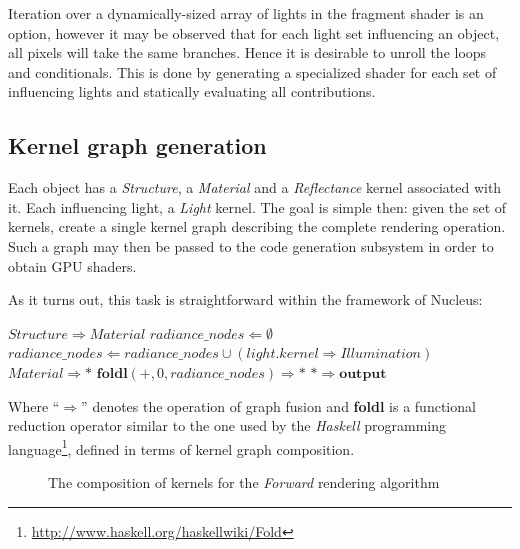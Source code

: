 Iteration over a dynamically-sized array of lights in the fragment shader is an option, however it may be observed that for each light set influencing an object, all pixels will take the same branches. Hence it is desirable to unroll the loops and conditionals. This is done by generating a specialized shader for each set of influencing lights and statically evaluating all contributions.

\subsection{Kernel graph generation}

Each object has a \emph{Structure}, a \emph{Material} and a \emph{Reflectance} kernel associated with it. Each influencing light, a \emph{Light} kernel. The goal is simple then: given the set of kernels, create a single kernel graph describing the complete rendering operation. Such a graph may then be passed to the code generation subsystem in order to obtain GPU shaders.

As it turns out, this task is straightforward within the framework of Nucleus:
	
\begin{algorithmic}
\STATE $Structure \Rightarrow Material$
\STATE $radiance\_nodes \Leftarrow \emptyset$
	\STATE $radiance\_nodes \Leftarrow radiance\_nodes \cup (light.kernel \Rightarrow Illumination)$
\ENDFOR
\STATE $Material \Rightarrow *$
\STATE $\textbf{foldl}(+, 0,radiance\_nodes) \Rightarrow *$
\STATE $* \Rightarrow \textbf{output}$
\end{algorithmic}

Where ``$\Rightarrow$'' denotes the operation of graph fusion and \textbf{foldl} is a functional reduction operator similar to the one used by the \emph{Haskell} programming language\footnote{\url{http://www.haskell.org/haskellwiki/Fold}}, defined in terms of kernel graph composition.

\begin{figure}[ht!]
  \centering
    \caption[Forward rendering graph]{The composition of kernels for the \emph{Forward} rendering algorithm}
  \label{fig:ForwardRenderingGraphSample}
\end{figure}

